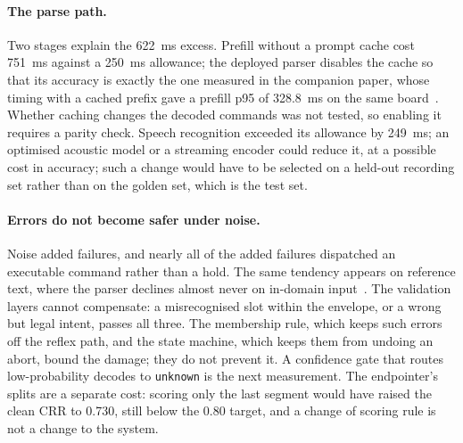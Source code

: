 \documentclass[a4paper,fleqn]{cas-dc}
\begin{document}
\paragraph{The parse path.} Two stages explain the 622~ms excess. Prefill without a prompt cache
cost 751~ms against a 250~ms allowance; the deployed parser disables the cache so that its accuracy
is exactly the one measured in the companion paper, whose timing with a cached prefix gave a prefill
p95 of 328.8~ms on the same board~\citep{companion}. Whether caching changes the decoded commands was
not tested, so enabling it requires a parity check. Speech recognition exceeded its allowance by
249~ms; an optimised acoustic model or a streaming encoder could reduce it, at a possible cost in
accuracy; such a change would have to be selected on a held-out recording set rather than on the golden set,
which is the test set.

\paragraph{Errors do not become safer under noise.} Noise added failures, and nearly all of the
added failures dispatched an executable command rather than a hold. The same tendency appears on
reference text, where the parser declines almost never on in-domain input~\citep{companion}. The
validation layers cannot compensate: a misrecognised slot within the envelope, or a wrong but legal
intent, passes all three. The membership rule, which keeps such errors off the reflex path, and the
state machine, which keeps them from undoing an abort, bound the damage; they do not prevent it. A
confidence gate that routes low-probability decodes to \texttt{unknown} is the next measurement.
The endpointer's splits are a separate cost: scoring only the last segment would have raised the
clean CRR to 0.730, still below the 0.80 target, and a change of scoring rule is not a change to the
system.
\end{document}
